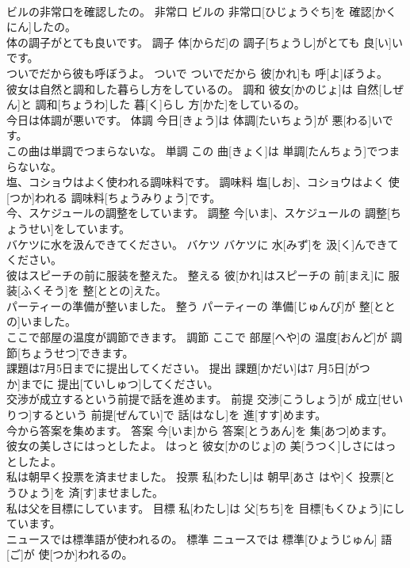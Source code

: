 \documentclass[8pt]{extreport}
\begin{document}
\begin{CJK}{UTF8}{min}
\\	ビルの非常口を確認したの。	非常口	ビルの 非常口[ひじょうぐち]を 確認[かくにん]したの。	
\\	体の調子がとても良いです。	調子	体[からだ]の 調子[ちょうし]がとても 良[い]いです。	
\\	ついでだから彼も呼ぼうよ。	ついで	ついでだから 彼[かれ]も 呼[よ]ぼうよ。	
\\	彼女は自然と調和した暮らし方をしているの。	調和	彼女[かのじょ]は 自然[しぜん]と 調和[ちょうわ]した 暮[く]らし 方[かた]をしているの。	
\\	今日は体調が悪いです。	体調	今日[きょう]は 体調[たいちょう]が 悪[わる]いです。	
\\	この曲は単調でつまらないな。	単調	この 曲[きょく]は 単調[たんちょう]でつまらないな。	
\\	塩、コショウはよく使われる調味料です。	調味料	塩[しお]、コショウはよく 使[つか]われる 調味料[ちょうみりょう]です。	
\\	今、スケジュールの調整をしています。	調整	今[いま]、スケジュールの 調整[ちょうせい]をしています。	
\\	バケツに水を汲んできてください。	バケツ	バケツに 水[みず]を 汲[く]んできてください。	
\\	彼はスピーチの前に服装を整えた。	整える	彼[かれ]はスピーチの 前[まえ]に 服装[ふくそう]を 整[ととの]えた。	
\\	パーティーの準備が整いました。	整う	パーティーの 準備[じゅんび]が 整[ととの]いました。	
\\	ここで部屋の温度が調節できます。	調節	ここで 部屋[へや]の 温度[おんど]が 調節[ちょうせつ]できます。	
\\	課題は7月5日までに提出してください。	提出	課題[かだい]は7 月5日[がつ 
\\	か]までに 提出[ていしゅつ]してください。	
\\	交渉が成立するという前提で話を進めます。	前提	交渉[こうしょう]が 成立[せいりつ]するという 前提[ぜんてい]で 話[はなし]を 進[すす]めます。	
\\	今から答案を集めます。	答案	今[いま]から 答案[とうあん]を 集[あつ]めます。	
\\	彼女の美しさにはっとしたよ。	はっと	彼女[かのじょ]の 美[うつく]しさにはっとしたよ。	
\\	私は朝早く投票を済ませました。	投票	私[わたし]は 朝早[あさ はや]く 投票[とうひょう]を 済[す]ませました。	
\\	私は父を目標にしています。	目標	私[わたし]は 父[ちち]を 目標[もくひょう]にしています。	
\\	ニュースでは標準語が使われるの。	標準	ニュースでは 標準[ひょうじゅん] 語[ご]が 使[つか]われるの。	

\end{CJK}
\end{document}
